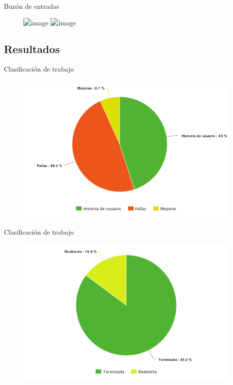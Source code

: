 \documentclass[10pt,xcolor=table]{beamer}
\begin{document}
\begin{frame}{Buzón de entradas}
	\begin{figure}
		\centering
		\includegraphics<1>[scale=0.3]{../Figuras/Pantallas/inbox}
		\includegraphics<2>[scale=0.3]{../Figuras/Pantallas/inbox_2}
	\end{figure}
\end{frame}

\subsection{Resultados}
\begin{frame}{Clasificación de trabajo}
	\begin{figure}
		\centering
	    \includegraphics[scale=0.235]{../Figuras/tickets_tipo}
	\end{figure}
\end{frame}

\begin{frame}{Clasificación de trabajo}
	\begin{figure}
		\centering
	    \includegraphics[scale=0.235]{../Figuras/historias_cerradas_reabiertas}
	\end{figure}
\end{frame}
\end{document}

